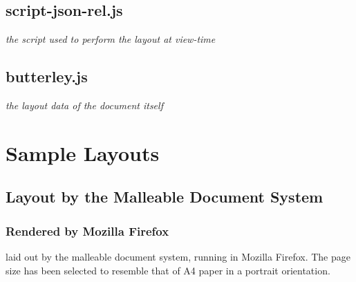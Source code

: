 \section{script-json-rel.js}
\emph{the script used to perform the layout at view-time}
%

\newpage

\section{butterley.js}
\emph{the layout data of the document itself}
%






\cleardoublepage
\chapter{Sample Layouts}
\label{app:layouts}

\section{Layout by the Malleable Document System}

\newlength{\imgwid}

\subsection{Rendered by Mozilla Firefox}
\label{app:layout-ff}

\cite{Pinkney2011} laid out by the malleable document system, running in Mozilla Firefox. The page size has been selected to resemble that of A4 paper in a portrait orientation.


